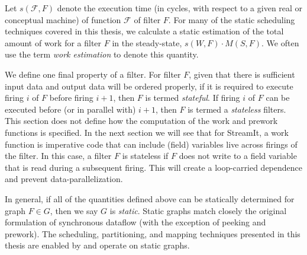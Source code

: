 Let $s(\mathcal{F}, F)$ denote the execution time (in cycles, with
respect to a given real or conceptual machine) of function
$\mathcal{F}$ of filter $F$.  For many of the static scheduling
techniques covered in this thesis, we calculate a static estimation of
the total amount of work for a filter $F$ in the steady-state, $s(W,
F) \cdot M(S, F)$.  We often use the term {\it work estimation} to
denote this quantity.

We define one final property of a filter.  For filter $F$, given that
there is sufficient input data and output data will be ordered
properly, if it is required to execute firing $i$ of $F$ before firing
$i+1$, then $F$ is termed {\it stateful}.  If firing $i$ of $F$ can be
executed before (or in parallel with) $i+1$, then $F$ is termed a {\it
  stateless} filters.  This section does not define how the
computation of the work and prework functions is specified.  In the
next section we will see that for StreamIt, a work function is
imperative code that can include (field) variables live across firings
of the filter.  In this case, a filter $F$ is stateless if $F$ does
not write to a field variable that is read during a subsequent firing.
This will create a loop-carried dependence and prevent
data-parallelization.

In general, if all of the quantities defined above can be statically
determined for graph $F \in G$, then we say $G$ is {\it static}.
Static graphs match closely the original formulation of synchronous
dataflow (with the exception of peeking and prework).  The scheduling,
partitioning, and mapping techniques presented in this thesis are
enabled by and operate on static graphs.
